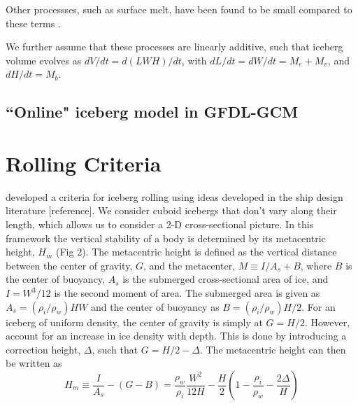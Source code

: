\documentclass[twocol]{ametsoc_tw}
\newcommand{\be}[0]{\begin{equation}}
\newcommand{\ee}[0]{\end{equation}}
\newcommand{\ri}{\rho_i}
\newcommand{\rw}{\rho_w}
\begin{document}
Other processses, such as surface melt, have been found to be small compared to these terms \citep{Savage:2001hz}.


We further assume that these processes are linearly additive, such that iceberg volume evolves as
$dV/dt = d(LWH)/dt$,  with $dL/dt = dW/dt = M_e + M_v$, and $dH/dt= M_b$. 

\subsection{``Online" iceberg model in GFDL-GCM}

\section{Rolling Criteria}

 \cite{Weeks:1978vi} developed a criteria for iceberg rolling using ideas developed in the ship design literature [reference]. We consider cuboid icebergs that don't vary along their length, which allows us to consider a 2-D cross-sectional picture. In this framework the vertical stability of a body is determined by its metacentric height, $H_m$ (Fig 2). The metacentric height is defined as the vertical distance between the center of gravity, $G$, and the metacenter, $M \equiv I/A_s+B$, where $B$ is the center of buoyancy, $A_s$ is the submerged cross-sectional area of ice, and $I = W^3/12$ is the second moment of area. The submerged area is given as $A_s = \left(\ri/\rw \right) H W$ and the center of buoyancy as $B = \left(\ri/\rw \right) H/2$. For an iceberg of uniform density, the center of gravity is simply at $G = H/2$. However, \cite{Weeks:1978vi} account for an increase in ice density with depth. This is done by introducing a correction height, $\Delta$, such that $G = H/2 -\Delta$. The metacentric height can then be written as
\be
 H_{m}\equiv\frac{I}{A_s} - (G-B) = \frac{\rw}{\ri}\frac{W^2}{12 H } - \frac{H}{2}(1 - \frac{\ri}{\rw} -\frac{2 \Delta}{H}) \label{hm}
\ee
\end{document}
